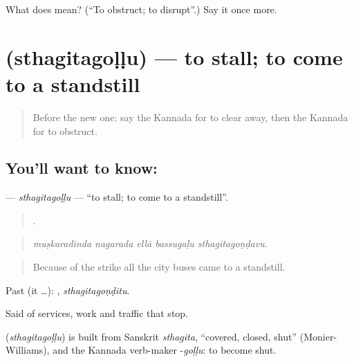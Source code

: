 \begin{tcolorbox}[breakable,colback=teal!4,colframe=teal!35!black,title={Before you move on}]
What does  mean? (\textquotedblleft{}To obstruct; to disrupt\textquotedblright{}.) Say it once more.
\end{tcolorbox}
\section[\texorpdfstring{\kn{ಸ್ಥಗಿತಗೊಳ್ಳು} (sthagitagoḷḷu)}{ಸ್ಥಗಿತಗೊಳ್ಳು (sthagitagoḷḷu)}]{ (sthagitagoḷḷu) — to stall; to come to a standstill}

\label{lesson:KA-C447-sthagitagollu}



\begin{quote}
Before the new one: say the Kannada for to clear away, then the Kannada for to obstruct.
\end{quote}

\subsection*{You'll want to know: }
\textbf{} — \emph{sthagitagoḷḷu} — \textquotedblleft{}to stall; to come to a standstill\textquotedblright{}.

\begin{quote}
    .
\end{quote}

\begin{quote}
\emph{muṣkaradinda nagarada ellā bassugaḷu sthagitagoṇḍavu.}
\end{quote}

\begin{quote}
Because of the strike all the city buses came to a standstill.
\end{quote}

Past (it …): , \emph{sthagitagoṇḍitu}.

Said of services, work and traffic that stop.

\begin{cousinweb}
\textbf{} (\emph{sthagitagoḷḷu}) is built from Sanskrit \emph{sthagita}, \textquotedblleft{}covered, closed, shut\textquotedblright{} (Monier-Williams), and the Kannada verb-maker -\emph{goḷḷu}: to become shut.
\end{cousinweb}

